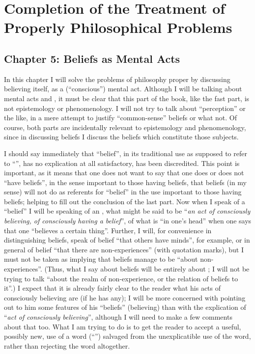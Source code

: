 \clearpage\section{Completion of the Treatment of Properly Philosophical Problems}\subsection[Chapter 5: Beliefs as Mental Acts][Beliefs as Mental Acts]{Chapter 5: Beliefs as Mental Acts}

In this chapter I will solve the problems of philosophy proper by discussing believing itself, as a (\enquote{conscious}) mental act. Although I will be talking about mental acts and , it must be clear that this part of the book, like the fast part, is not epistemology or phenomenology. I will not try to talk about \enquote{perception} or the like, in a mere attempt to justify \enquote{common-sense} beliefs or what not. Of course, both parts are incidentally relevant to epistemology and phenomenology, since in discussing beliefs I discuss the beliefs which constitute those subjects. 

I should say immediately that \enquote{belief}, in its traditional use as supposed to refer to \enquote{}, has no explication at all satisfactory, has been discredited. This point is important, as it means that one does not want to say that one does or does not \enquote{have beliefs}, in the sense important to those having beliefs, that beliefs (in my sense) will not do as referents for \enquote{belief} in the use important to those having beliefs; helping to fill out the conclusion of the last part. Now when I speak of a \enquote{belief} I will be speaking of an , what might be said to be \enquote{\emph{an act of consciously believing, of consciously having a belief}}, of what is \enquote{in one's head} when one says that one \enquote{believes a certain thing}. Further, I will, for convenience in distinguishing beliefs, speak of belief \enquote{that others have minds}, for example, or in general of belief \enquote{that there are non-experiences} (with quotation marks), but I must not be taken as implying that beliefs manage to be \enquote{about non-experiences}. (Thus, what I say about beliefs will be entirely about ; I will not be trying to talk \enquote{about the realm of non-experience, or the relation of beliefs to it}.) I expect that it is already fairly clear to the reader what his acts of consciously believing are (if he has any); I will be more concerned with pointing out to him some features of his \enquote{beliefs} (believing) than with the explication of \enquote{\emph{act of consciously believing}}, although I will need to make a few comments about that too. What I am trying to do is to get the reader to accept a useful, possibly new, use of a word (\enquote{}) salvaged from the unexplicatible use of the word, rather than rejecting the word altogether. 

